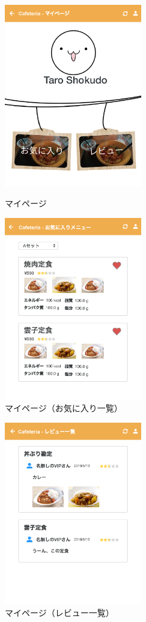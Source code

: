 \documentclass[a4paper]{ltjsarticle}
\begin{document}
        \begin{figure}[ht]
            \begin{minipage}[t]{.49\textwidth}
                \center
                \includegraphics[width=60mm]{ui/my-page.png}
                \caption{マイページ}
                \label{img:my-page}
            \end{minipage}
            \begin{minipage}[t]{.49\textwidth}
                \center
                \includegraphics[width=60mm]{ui/liked-list.png}
                \caption{マイページ（お気に入り一覧）}
                \label{img:liked-list}
            \end{minipage}
        \end{figure}
        \begin{figure}[ht]
            \center
            \includegraphics[width=60mm]{ui/review-list.png}
            \caption{マイページ（レビュー一覧）}
            \label{img:review-list}
        \end{figure}
\end{document}
